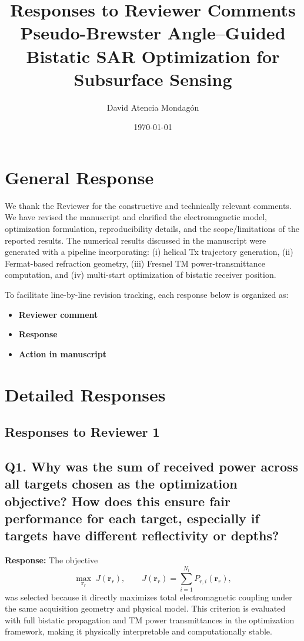 \documentclass[11pt]{article}
\title{Responses to Reviewer Comments\\
\large Pseudo-Brewster Angle--Guided Bistatic SAR Optimization for Subsurface Sensing}
\author{David Atencia Mondag\'on}
\date{\today}
\begin{document}
\maketitle

\section*{General Response}
We thank the Reviewer for the constructive and technically relevant comments. We have revised the manuscript and clarified the electromagnetic model, optimization formulation, reproducibility details, and the scope/limitations of the reported results. The numerical results discussed in the manuscript were generated with a pipeline incorporating: (i) helical Tx trajectory generation, (ii) Fermat-based refraction geometry, (iii) Fresnel TM power-transmittance computation, and (iv) multi-start optimization of bistatic receiver position.

To facilitate line-by-line revision tracking, each response below is organized as:
\begin{itemize}[leftmargin=2em]
\item \textbf{Reviewer comment}
\item \textbf{Response}
\item \textbf{Action in manuscript}
\end{itemize}

\section*{Detailed Responses}

\subsection*{Responses to Reviewer 1}

\subsection*{Q1. Why was the sum of received power across all targets chosen as the optimization objective? How does this ensure fair performance for each target, especially if targets have different reflectivity or depths?}
\textbf{Response:} The objective
\begin{equation}
\max_{\bm r_r}\;J(\bm r_r),\qquad J(\bm r_r)=\sum_{i=1}^{N_t} P_{r,i}(\bm r_r),
\end{equation}
was selected because it directly maximizes total electromagnetic coupling under the same acquisition geometry and physical model. This criterion is evaluated with full bistatic propagation and TM power transmittances in the optimization framework, making it physically interpretable and computationally stable.
\end{document}

